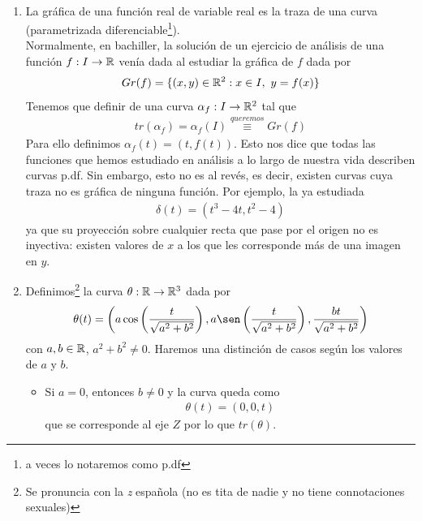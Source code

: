 \begin{ejemplo}\
    \begin{enumerate}
        \item La gráfica de una función real de variable real es la traza de una curva (parametrizada diferenciable\footnote{a veces lo notaremos como p.df}).\\
        
        Normalmente, en bachiller, la solución de un ejercicio de análisis de una función $f:I\to \mathbb{R}$ venía dada al estudiar la gráfica de $f$ dada por
        \begin{gather*}
            Gr(f) = \{(x,y)\in \mathbb{R}^2 : x\in I,\ y=f(x)\}
        \end{gather*}
        Tenemos que definir de una curva $\alpha_f:I\to \mathbb{R}^2$ tal que
        \begin{gather*}
            tr(\alpha_f) = \alpha_f(I) \overset{queremos}{\equiv} Gr(f)
        \end{gather*}
        Para ello definimos $\alpha_f(t) = (t,f(t))$. Esto nos dice que todas las funciones que hemos estudiado en análisis a lo largo de nuestra vida describen curvas p.df. Sin embargo, esto no es al revés, es decir, existen curvas cuya traza no es gráfica de ninguna función. Por ejemplo, la ya estudiada
        \begin{gather*}
            \delta(t) = (t^3-4t, t^2-4)
        \end{gather*}
        ya que su proyección sobre cualquier recta que pase por el origen no es inyectiva: existen valores de $x$ a los que les corresponde más de una imagen en $y$.

        \item Definimos\footnote{Se pronuncia con la \textit{z} española (no es tita de nadie y no tiene connotaciones sexuales)}  la curva $\theta : \mathbb{R} \to \mathbb{R}^3$ dada por
        \begin{gather*}
            \theta(t) = \left(a\cos\left(\frac{t}{\sqrt{a^2+ b^2}}\right), a\sen\left(\frac{t}{\sqrt{a^2+ b^2}}\right), \frac{bt}{\sqrt{a^2 + b^2}}\right)
        \end{gather*}
        con $a,b\in \mathbb{R}$, $a^2 +b^2\neq 0$. Haremos una distinción de casos según los valores de $a$ y $b$.
        \begin{itemize}
            \item Si $a=0$, entonces $b\neq 0$ y la curva queda como 
            \begin{gather*}
                \theta(t) = (0,0,t)
            \end{gather*}
            que se corresponde al eje $Z$ por lo que $tr(\theta) $.


\end{itemize}
\end{enumerate}
\end{ejemplo}
